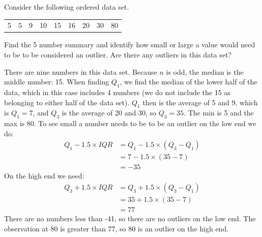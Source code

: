 \begin{example}
{Consider the following ordered data set.
\begin{center}
\begin{tabular}{ccc ccc ccc}
5 & 5 & 9 & 10 & 15 & 16 & 20 & 30 & 80 
\end{tabular}
\end{center}
Find the 5 number summary and identify how small or large a value would need to be to be considered an outlier.  Are there any outliers in this data set?}
There are nine numbers in this data set.  Because $n$ is odd, the median is the middle number: 15.  When finding $Q_1$, we find the median of the lower half of the data, which in this case includes 4 numbers (we do not include the 15 as belonging to either half of the data set).  $Q_1$ then is the average of 5 and 9, which is $Q_1 = 7$, and $Q_3$ is the average of 20 and 30, so $Q_3 = 35$.  The min is 5 and the max is 80.  To see small a number needs to be to be an outlier on the low end we do:
\begin{align*}
Q_1 - 1.5 \times IQR
	&= Q_1 - 1.5 \times (Q_3 - Q_1) \\
	& = 7 - 1.5 \times (35 - 7) \\
	& = -35
\end{align*}
On the high end we need:
\begin{align*}
Q_3 + 1.5 \times IQR
	& = Q_3 + 1.5 \times (Q_3-Q_1) \\
	& = 35 + 1.5 \times (35 - 7) \\
	& = 77
\end{align*}
There are no numbers less than -41, so there are no outliers on the low end. The observation at 80 is greater than 77, so 80 is an outlier on the high end.
\end{example}




